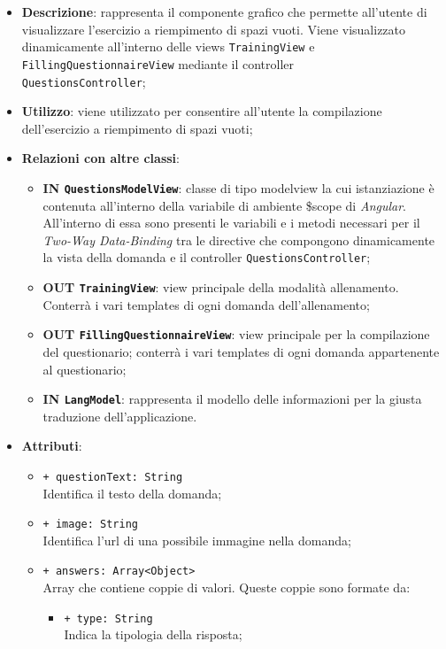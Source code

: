 		\begin{itemize}
			\item \textbf{Descrizione}: rappresenta il componente grafico che permette all'utente di visualizzare l'esercizio a riempimento di spazi vuoti. Viene visualizzato dinamicamente all'interno delle views \texttt{TrainingView} e \texttt{FillingQuestionnaireView} mediante il controller \\ \texttt{QuestionsController};
			\item \textbf{Utilizzo}: viene utilizzato per consentire all'utente la compilazione dell'esercizio a riempimento di spazi vuoti;
			\item \textbf{Relazioni con altre classi}: 
			\begin{itemize}
				\item \textbf{IN \texttt{QuestionsModelView}}: classe di tipo modelview la cui istanziazione è contenuta all'interno della variabile di ambiente \$scope di \textit{Angular}. All'interno di essa sono presenti le variabili e i metodi necessari per il \textit{Two-Way Data-Binding} tra le directive che compongono dinamicamente la vista della domanda e il controller \texttt{QuestionsController};
				\item \textbf{OUT \texttt{TrainingView}}: view principale della modalità allenamento. Conterrà i vari templates di ogni domanda dell'allenamento;
				\item \textbf{OUT \texttt{FillingQuestionnaireView}}: view principale per la compilazione del questionario; conterrà i vari templates di ogni domanda appartenente al questionario;   
				\item \textbf{IN \texttt{LangModel}}: rappresenta il modello delle informazioni per la giusta traduzione dell'applicazione.
			\end{itemize}
			\item \textbf{Attributi}:
			\begin{itemize}
				\item \texttt{+ questionText: String} \\ Identifica il testo della domanda;
				\item \texttt{+ image: String} \\ Identifica l'url di una possibile immagine nella domanda;
				\item \texttt{+ answers: Array<Object>} \\ Array che contiene coppie di valori. Queste coppie sono formate da:
				\begin{itemize}
					\item \texttt{+ type: String} \\ Indica la tipologia della risposta;

\end{itemize}
\end{itemize}
\end{itemize}
